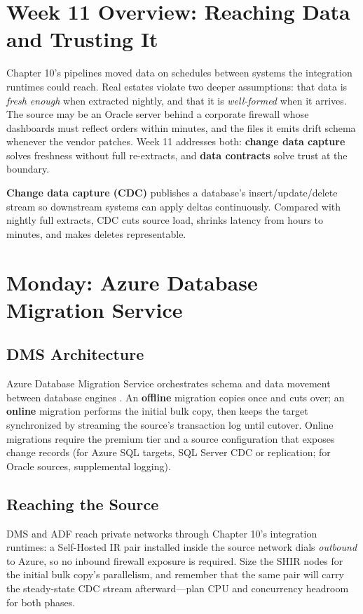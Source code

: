 \section{Week 11 Overview: Reaching Data and Trusting It}
Chapter 10's pipelines moved data on schedules between systems the integration runtimes could reach. Real estates violate two deeper assumptions: that data is \emph{fresh enough} when extracted nightly, and that it is \emph{well-formed} when it arrives. The source may be an Oracle server behind a corporate firewall whose dashboards must reflect orders within minutes, and the files it emits drift schema whenever the vendor patches. Week 11 addresses both: \textbf{change data capture} solves freshness without full re-extracts, and \textbf{data contracts} solve trust at the boundary.

\begin{definitionbox}
\textbf{Change data capture (CDC)} publishes a database's insert/update/delete stream so downstream systems can apply deltas continuously. Compared with nightly full extracts, CDC cuts source load, shrinks latency from hours to minutes, and makes deletes representable.
\end{definitionbox}

\section{Monday: Azure Database Migration Service}

\subsection{DMS Architecture}
Azure Database Migration Service orchestrates schema and data movement between database engines \cite{microsoft2025dms}. An \textbf{offline} migration copies once and cuts over; an \textbf{online} migration performs the initial bulk copy, then keeps the target synchronized by streaming the source's transaction log until cutover. Online migrations require the premium tier and a source configuration that exposes change records (for Azure SQL targets, SQL Server CDC or replication; for Oracle sources, supplemental logging).

\subsection{Reaching the Source}
DMS and ADF reach private networks through Chapter 10's integration runtimes: a Self-Hosted IR pair installed inside the source network dials \emph{outbound} to Azure, so no inbound firewall exposure is required. Size the SHIR nodes for the initial bulk copy's parallelism, and remember that the same pair will carry the steady-state CDC stream afterward---plan CPU and concurrency headroom for both phases.
